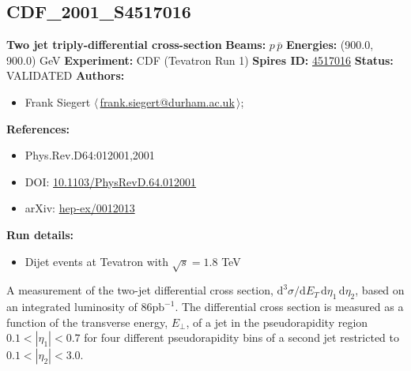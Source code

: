 \subsection[CDF\_2001\_S4517016]{CDF\_2001\_S4517016\,\cite{Affolder:2000ew}}
\textbf{Two jet triply-differential cross-section}\newline
\textbf{Beams:} $p$\,$\bar{p}$ \newline
\textbf{Energies:} (900.0, 900.0) GeV \newline
\textbf{Experiment:} CDF (Tevatron Run 1) \newline
\textbf{Spires ID:} \href{http://www.slac.stanford.edu/spires/find/hep/www?rawcmd=key+4517016}{4517016}\newline
\textbf{Status:} VALIDATED\newline
\textbf{Authors:}
\begin{itemize}
  \item Frank Siegert $\langle\,$\href{mailto:frank.siegert@durham.ac.uk}{frank.siegert@durham.ac.uk}$\,\rangle$;
\end{itemize}
\textbf{References:}
\begin{itemize}
  \item Phys.Rev.D64:012001,2001
  \item DOI: \href{http://dx.doi.org/10.1103/PhysRevD.64.012001}{10.1103/PhysRevD.64.012001}
  \item arXiv: \href{http://arxiv.org/abs/hep-ex/0012013}{hep-ex/0012013}
\end{itemize}
\textbf{Run details:}
\begin{itemize}

  \item Dijet events at Tevatron with $\sqrt{s}=1.8$ TeV\end{itemize}

\noindent A measurement of the two-jet differential cross section, $\mathrm{d}^3\sigma/\mathrm{d}E_T \, \mathrm{d}\eta_1 \, \mathrm{d}\eta_2$, based on an integrated luminosity of $86 \mathrm{pb}^{-1}$. The differential cross section is measured as a function of the transverse energy, $E_\perp$, of a jet in the pseudorapidity region $0.1 < |\eta_1| < 0.7$ for four different pseudorapidity bins of a second jet restricted to $0.1 < |\eta_2| < 3.0$.

\clearpage


\clearpage

